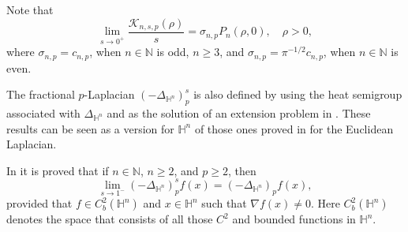 \documentclass[a4paper,10pt, reqno]{amsart}
\theoremstyle{definition}
\theoremstyle{remark}
\numberwithin{equation}{section}
\begin{document}
Note that
\begin{equation}\label{limKP}
\lim_{s\rightarrow 0^+}\frac{\mathcal K_{n,s,p}(\rho )}{s}=\sigma_{n,p}P_n(\rho ,0),\quad \rho >0,
\end{equation}
where $\sigma_{n,p}=c_{n,p}$, when $n\in \mathbb N$ is odd, $n\geq 3$, and $\sigma_{n,p}=\pi ^{-1/2}c_{n,p}$, when $n\in \mathbb N$ is even.

The fractional $p$-Laplacian $(-\Delta_{\mathbb H^n})_p^s$ is also defined by using the heat semigroup associated with $\Delta_{\mathbb H^n}$ and as the solution of an extension problem in \cite{KKL}. These results can be seen as a version for $\mathbb H^n$ of those ones proved in \cite{TGV} for the Euclidean Laplacian.

In \cite[Theorem 1.5]{KKL} it is proved that if $n\in \mathbb N$, $n\geq 2$, and $p\geq 2$, then
$$
\lim_{s\rightarrow 1^-}(-\Delta_{\mathbb H^n})_p^sf(x)=(-\Delta_{\mathbb H^n})_pf(x),
$$
provided that $f\in C_b^2(\mathbb H^n)$ and $x\in \mathbb H^n$ such that $\nabla f(x)\not=0$. Here $C_b^2(\mathbb H^n)$ denotes the space that consists of all those $C^2$ and bounded functions in $\mathbb H^n$.
\end{document}
